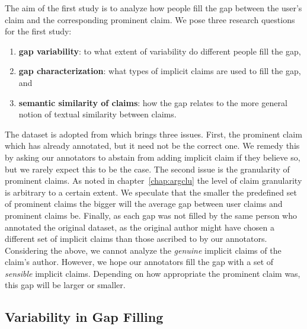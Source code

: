 The aim of the first study is to analyze how people fill 
the gap between the user's claim and the corresponding prominent claim. 
We pose three research questions for the first study: 
\begin{enumerate}[label=\arabic*)]
\item \textbf{gap variability}: to what extent of variability do different people fill the gap,
\item \textbf{gap characterization}: what types of implicit claims are used to fill the gap, and
\item \textbf{semantic similarity of claims}: how the gap relates to the more general notion of 
textual similarity between claims. 
\end{enumerate}
The dataset is adopted from \citet{hasan2014you} which brings three issues. 
First, the prominent claim which has already annotated, but it need not be
the correct one. 
We remedy this by asking our annotators to abstain from adding implicit claim if 
they believe so, but we rarely expect this to be the case. 
The second issue is the granularity of prominent claims. 
As noted in chapter~\ref{chap:argclu} the level of claim granularity is 
arbitrary to a certain extent. 
We speculate that the smaller the predefined set of prominent claims the 
bigger will the average gap between user claims and prominent claims be. 
Finally, as each gap was not filled by the same person who annotated the original 
dataset, as the original author might have chosen a different set of implicit claims than those
ascribed to by our annotators. 
Considering the above, we cannot analyze the \emph{genuine} implicit claims
of the claim's author. 
However, we hope our annotators fill the gap with a set of \emph{sensible} implicit 
claims. 
Depending on how appropriate the prominent claim was, this gap will be larger or smaller. 

\subsection{Variability in Gap Filling} 


